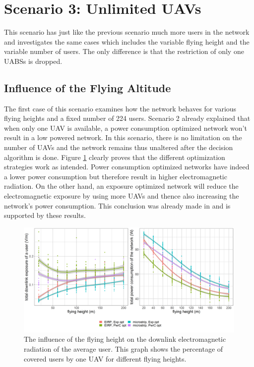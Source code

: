 \section{Scenario 3: Unlimited \gls{UAV}s}
\label{s3}

This scenario has just like the previous scenario much more users in the network 
and investigates the same cases which includes the variable flying height and the variable number of  users.
The only difference is that the restriction of only one \gls{UABS}s is dropped.

\subsection{Influence of the Flying Altitude}
\label{S3A}

The first case of this scenario examines how the network behaves for various flying heights and a fixed number of 224 users.
Scenario 2 already explained that when only one \gls{UAV} is available, a power consumption optimized network won’t result in a low 
powered network. In this scenario, there is no limitation on the number of \gls{UAV}s and the network remains thus unaltered after the decision 
algorithm is done. Figure \ref{fig:s3a_dlAndPc} clearly proves that the different optimization strategies work as intended.
Power consumption optimized networks have indeed a lower power consumption but therefore result in higher electromagnetic radiation.
On the other hand, an exposure optimized network will reduce the electromagnetic exposure by using more \gls{UAV}s and thence also increasing the network's power consumption.
This conclusion was already made  in \cite{J1} and is supported by these results.

\begin{figure}[h!]
  \includegraphics[width=\textwidth]{../results/s3/fhvsdlAndPc.png}
  \caption{The influence of the flying height on the downlink electromagnetic radiation of the average user. This graph shows the percentage of covered users by one \gls{UAV} for different flying heights.}
  \label{fig:s3a_dlAndPc}
\end{figure}

